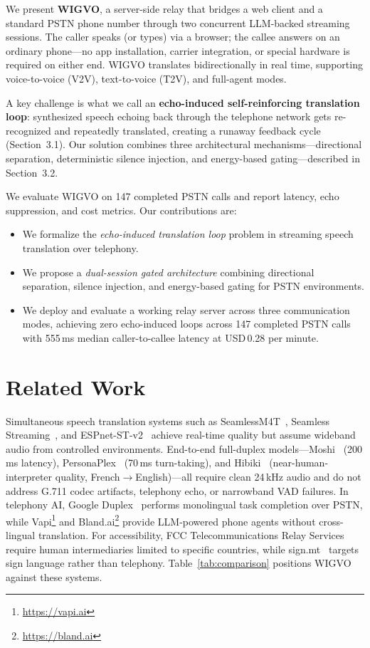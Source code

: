 \documentclass[11pt]{article}
\begin{document}
We present \textbf{WIGVO}, a server-side relay that bridges a web client and a standard PSTN phone number through two concurrent LLM-backed streaming sessions. The caller speaks (or types) via a browser; the callee answers on an ordinary phone---no app installation, carrier integration, or special hardware is required on either end. WIGVO translates bidirectionally in real time, supporting voice-to-voice (V2V), text-to-voice (T2V), and full-agent modes.

A key challenge is what we call an \textbf{echo-induced self-reinforcing translation loop}: synthesized speech echoing back through the telephone network gets re-recognized and repeatedly translated, creating a runaway feedback cycle (Section~3.1). Our solution combines three architectural mechanisms---directional separation, deterministic silence injection, and energy-based gating---described in Section~3.2.

We evaluate WIGVO on 147 completed PSTN calls and report latency, echo suppression, and cost metrics. Our contributions are:
\begin{itemize}
    \item We formalize the \emph{echo-induced translation loop} problem in streaming speech translation over telephony.
    \item We propose a \emph{dual-session gated architecture} combining directional separation, silence injection, and energy-based gating for PSTN environments.
    \item We deploy and evaluate a working relay server across three communication modes, achieving zero echo-induced loops across 147 completed PSTN calls with 555\,ms median caller-to-callee latency at USD\,0.28 per minute.
\end{itemize}

\section{Related Work}

Simultaneous speech translation systems such as SeamlessM4T~\citep{seamless_m4t_2023}, Seamless Streaming~\citep{seamless_streaming_2023}, and ESPnet-ST-v2~\citep{espnet_st_v2_2023} achieve real-time quality but assume wideband audio from controlled environments. End-to-end full-duplex models---Moshi~\citep{defossez2024moshi} (200\,ms latency), PersonaPlex~\citep{roy2026personaplex} (70\,ms turn-taking), and Hibiki~\citep{labiausse2025hibiki} (near-human-interpreter quality, French$\to$English)---all require clean 24\,kHz audio and do not address G.711 codec artifacts, telephony echo, or narrowband VAD failures. In telephony AI, Google Duplex~\citep{google_duplex_2018} performs monolingual task completion over PSTN, while Vapi\footnote{\url{https://vapi.ai}} and Bland.ai\footnote{\url{https://bland.ai}} provide LLM-powered phone agents without cross-lingual translation. For accessibility, FCC Telecommunications Relay Services~\citep{fcc_trs_2024} require human intermediaries limited to specific countries, while sign.mt~\citep{sign_mt_2024} targets sign language rather than telephony. Table~\ref{tab:comparison} positions WIGVO against these systems.
\end{document}
